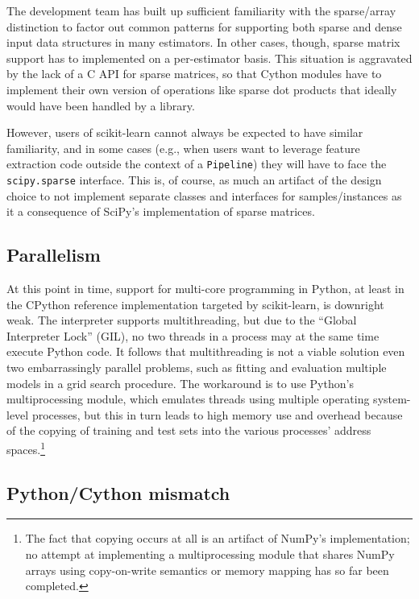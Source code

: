 \documentclass[a4paper,twocolumn]{article}
\begin{document}
The development team has built up sufficient familiarity
with the sparse/array distinction to factor out common patterns
for supporting both sparse and dense input data structures in many estimators.
In other cases, though, sparse matrix support has to implemented
on a per-estimator basis.
This situation is aggravated by the lack of a C API for sparse matrices,
so that Cython modules have to implement their own version
of operations like sparse dot products
that ideally would have been handled by a library.

However, users of scikit-learn cannot always be expected
to have similar familiarity, and in some cases
(e.g., when users want to leverage feature extraction code
outside the context of a \texttt{Pipeline})
they will have to face the \texttt{scipy.sparse} interface.
This is, of course, as much an artifact of the design choice
to not implement separate classes and interfaces for samples/instances
as it a consequence of SciPy's implementation of sparse matrices.

\subsection{Parallelism}

At this point in time, support for multi-core programming in Python,
at least in the CPython reference implementation targeted by scikit-learn,
is downright weak.
The interpreter supports multithreading, but due to the ``Global Interpreter Lock'' (GIL),
no two threads in a process may at the same time execute Python code.
It follows that multithreading is not a viable solution
even two embarrassingly parallel problems,
such as fitting and evaluation multiple models in a grid search procedure.
The workaround is to use Python's multiprocessing module,
which emulates threads using multiple operating system-level processes,
but this in turn leads to high memory use and overhead
because of the copying of training and test sets
into the various processes' address spaces.\footnote{
  The fact that copying occurs at all is an artifact of NumPy's implementation;
  no attempt at implementing a multiprocessing module
  that shares NumPy arrays using copy-on-write semantics or memory mapping
  has so far been completed.}

\subsection{Python/Cython mismatch}
\end{document}
